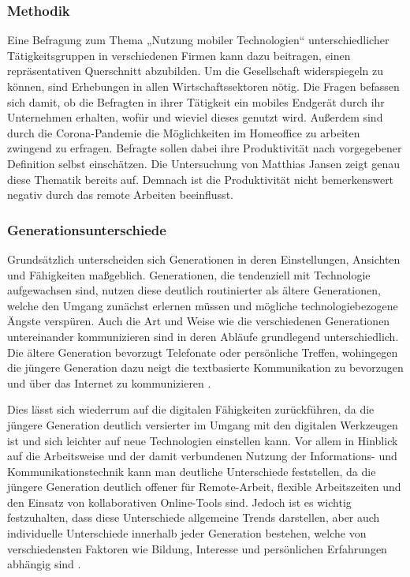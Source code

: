 \documentclass[12pt,a4paper]{article}
\begin{document}
\subsubsection*{Methodik}
Eine Befragung zum Thema „Nutzung mobiler Technologien“ unterschiedlicher Tätigkeitsgruppen in verschiedenen Firmen kann dazu beitragen, einen repräsentativen Querschnitt abzubilden.  
Um die Gesellschaft widerspiegeln zu können, sind Erhebungen in allen Wirtschaftssektoren nötig. 
Die Fragen befassen sich damit, ob die Befragten in ihrer Tätigkeit ein mobiles Endgerät durch ihr Unternehmen erhalten, wofür und wieviel dieses genutzt wird.  
Außerdem sind durch die Corona-Pandemie die Möglichkeiten im Homeoffice zu arbeiten zwingend zu erfragen.  
Befragte sollen dabei ihre Produktivität nach vorgegebener Definition selbst einschätzen. 
Die Untersuchung von Matthias Jansen \parencite{janson2020statistic} zeigt genau diese Thematik bereits auf. 
Demnach ist die Produktivität nicht bemerkenswert negativ durch das remote Arbeiten beeinflusst. 
 

\subsubsection*{Generationsunterschiede}
Grundsätzlich unterscheiden sich Generationen in deren Einstellungen, Ansichten und Fähigkeiten maßgeblich.
Generationen, die tendenziell mit Technologie aufgewachsen sind, nutzen diese deutlich routinierter als ältere Generationen, welche den Umgang zunächst erlernen müssen und mögliche technologiebezogene Ängste verspüren. Auch die Art und Weise wie die verschiedenen Generationen untereinander kommunizieren sind in deren Abläufe grundlegend unterschiedlich. Die ältere Generation bevorzugt Telefonate oder persönliche Treffen, wohingegen die jüngere Generation dazu neigt die textbasierte Kommunikation zu bevorzugen und über das Internet zu kommunizieren \parencite[vgl.][]{wollersheim2021bildung}. 

Dies lässt sich wiederrum auf die digitalen Fähigkeiten zurückführen, da die jüngere Generation deutlich versierter im Umgang mit den digitalen Werkzeugen ist und sich leichter auf neue Technologien einstellen kann. Vor allem in Hinblick auf die Arbeitsweise und der damit verbundenen Nutzung der Informations- und Kommunikationstechnik kann man deutliche Unterschiede feststellen, da die jüngere Generation deutlich offener für Remote-Arbeit, flexible Arbeitszeiten und den Einsatz von kollaborativen Online-Tools sind. Jedoch ist es wichtig festzuhalten, dass diese Unterschiede allgemeine Trends darstellen, aber auch individuelle Unterschiede innerhalb jeder Generation bestehen, welche von verschiedensten Faktoren wie Bildung, Interesse und persönlichen Erfahrungen abhängig sind \parencite[vgl.][]{gorovoj2019technologieakzeptanz}.
\end{document}
